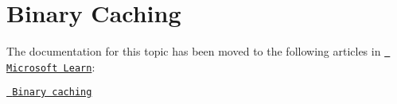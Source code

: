 \chapter{Binary Caching}
\hypertarget{md_external_2reflect-cpp_2vcpkg_2docs_2users_2binarycaching}{}\label{md_external_2reflect-cpp_2vcpkg_2docs_2users_2binarycaching}
\label{md_external_2reflect-cpp_2vcpkg_2docs_2users_2binarycaching_autotoc_md758}%
%


The documentation for this topic has been moved to the following articles in \href{https://learn.microsoft.com/vcpkg}{\texttt{ Microsoft Learn}}\+:


\begin{DoxyItemize}
\item \href{https://learn.microsoft.com/vcpkg/users/binarycaching}{\texttt{ Binary caching}} 
\end{DoxyItemize}